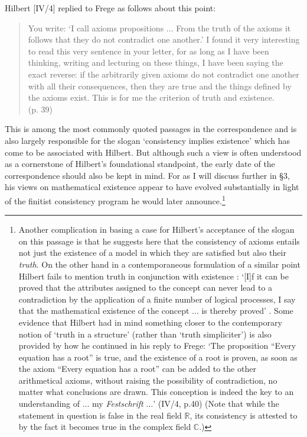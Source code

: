 \documentclass[11pt,fleqn,leqno]{article}
\begin{document}
Hilbert [IV/4] replied to Frege as follows about this point:
\begin{quote}
\footnotesize{You write: `I call axioms propositions $\ldots$ From the truth of the axioms it follows that they do not contradict one another.' I found it very interesting to read this very sentence in your letter, for as long as I have been thinking, writing and lecturing on these things, I have been saying the exact reverse: if the arbitrarily given axioms do not contradict one another with all their consequences, then they are true and the things defined by the axioms exist. This is for me the criterion of truth and existence. \\ \hspace*{1ex} \hfill (p. 39)}
\end{quote}
This is among the most commonly quoted passages in the correspondence and is also largely responsible for the slogan `consistency implies existence' which has come to be associated with Hilbert.   But although such a view is often understood as a cornerstone of Hilbert's foundational standpoint, the early date of the correspondence should also be kept in mind.  For as I will discuss further in \S 3, his views on mathematical existence appear to have evolved substantially in light of the finitist consistency program he would later announce.\footnote{Another complication in basing a case for Hilbert's acceptance of the slogan on this passage is that he suggests here that the consistency of axioms entails not just the existence of a model in which they are satisfied but also their \textsl{truth}.   On the other hand in a contemporaneous formulation of a similar point Hilbert fails to mention truth in conjunction with existence :  `[I]f it can be proved that the attributes assigned to the concept can never lead to a contradiction by the application of a finite number of logical processes, I say that the mathematical existence of the concept $\ldots$ is thereby proved' \citeyearpar[p. 10]{Hilbert1900}.  Some evidence that Hilbert had in mind something closer to the contemporary notion of `truth in a structure' (rather than `truth simpliciter') is also provided by how he continued in his reply to Frege:  `The proposition ``Every equation has a root'' is true, and the existence of a root is proven, as soon as the axiom ``Every equation has a root'' can be added to the other arithmetical axioms, without raising the possibility of contradiction, no matter what conclusions are drawn. This conception is indeed the key to an understanding of $\ldots$ my \textsl{Festschrift} $\ldots$' (IV/4, p.40)   (Note that while the statement in question is false in the real field $\mathbb{R}$, its consistency is attested to by the fact it becomes true in the complex field $\mathbb{C}$.)}
\end{document}
